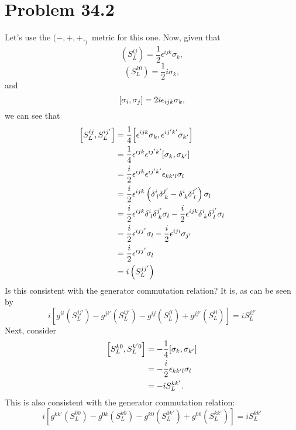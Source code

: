 \documentclass[12pt]{article}
\begin{document}
\section*{Problem 34.2}
Let's use the $(-,+,+,_)$ metric for this one. Now, given that
\[ \left(S_L^{ij}\right) = \frac{1}{2}\epsilon^{ijk}\sigma_k, \]
\[ \left(S_L^{k0}\right) = \frac{1}{2}i\sigma_k, \]
and
\[ \comm{\sigma_i}{\sigma_j} = 2i\epsilon_{ijk}\sigma_k, \]
we can see that
\begin{align*}
    \comm{S_L^{ij}}{S_L^{ij'}} &= \frac{1}{4}\comm{\epsilon^{ijk}\sigma_k}{\epsilon^{ij'k'}\sigma_{k'}} \\
    &= \frac{1}{4}\epsilon^{ijk}\epsilon^{ij'k'}\comm{\sigma_k}{\sigma_{k'}} \\
    &= \frac{i}{2}\epsilon^{ijk}\epsilon^{ij'k'}\epsilon_{kk'l}\sigma_l \\
    &= \frac{i}{2}\epsilon^{ijk}\left(\delta_{\;l}^{i}\delta_{\;k}^{j'} - \delta_{\;k}^{i}\delta_{\;l}^{j'}\right)\sigma_l \\
    &= \frac{i}{2}\epsilon^{ijk}\delta_{\;l}^{i}\delta_{\;k}^{j'}\sigma_l - \frac{i}{2}\epsilon^{ijk}\delta_{\;k}^{i}\delta_{\;l}^{j'}\sigma_l \\
    &= \frac{i}{2}\epsilon^{ijj'}\sigma_l - \frac{i}{2}\epsilon^{iji}\sigma_{j'} \\
    &= \frac{i}{2}\epsilon^{ijj'}\sigma_l \\
    &= i\left(S_L^{jj'}\right)
\end{align*}
Is this consistent with the generator commutation relation? It is, as can be seen by
\[ i\left[g^{ii}\left(S_L^{jj'}\right) - g^{ji'}\left(S_L^{ij'}\right) - g^{ij}\left(S_L^{ji}\right) + g^{jj'}\left(S_L^{ii}\right)\right] = iS_L^{jj'} \]
Next, consider
\begin{align*}
    \comm{S_L^{k0}}{S_L^{k'0}} &= -\frac{1}{4}\comm{\sigma_k}{\sigma_{k'}} \\
    &= -\frac{i}{2}\epsilon_{kk'l}\sigma_l \\
    &= -iS_L^{kk'}.
\end{align*}
This is also consistent with the generator commutation relation:
\[ i\left[g^{kk'}\left(S_L^{00}\right) - g^{0k}\left(S_L^{k0}\right) - g^{k0}\left(S_L^{0k'}\right) + g^{00}\left(S_L^{kk'}\right)\right] = iS_L^{kk'} \]
\end{document}
